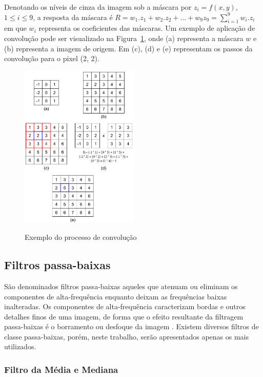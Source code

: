 \documentclass[12pt,oneside,a4paper,english,french,spanish,brazil,]{abntex2}
\begin{document}
Denotando os níveis de cinza da imagem sob a máscara por \(z_i=f(x,y)\), \(1\leq i\leq 9\), a resposta da máscara é \(R=w_1.z_1+w_2.z_2+...+w_9z_9 = \sum_{i=1}^{9}w_i.z_i\) em que \(w_i\) representa os coeficientes das máscaras. Um exemplo de aplicação de convolução pode ser visualizado na Figura~\ref{fig:PDI_Convolucao}, onde (a) representa a máscara \(w\) e (b) representa a imagem de origem. Em (c), (d) e (e) representam os passos da convolução para o pixel (2, 2).
	
\begin{figure}[ht]
\centering
\caption{Exemplo do processo de convolução}
\includegraphics[width=0.5\textwidth]{imagens/PDI_Convolucao.pdf}
\sourceAuthor
\label{fig:PDI_Convolucao}
\end{figure}

\subsection{Filtros passa-baixas}

São denominados filtros passa-baixas aqueles que atenuam ou eliminam os componentes de alta-frequência enquanto deixam as frequências baixas inalteradas. Os componentes de alta-frequência caracterizam bordas e outros detalhes finos de uma imagem, de forma que o efeito resultante da filtragem passa-baixas é o borramento ou desfoque da imagem \cite{gonzalez:2012}. Existem diversos filtros de classe passa-baixas, porém, neste trabalho, serão apresentados apenas os mais utilizados.

\subsubsection{Filtro da Média e Mediana}
\end{document}

